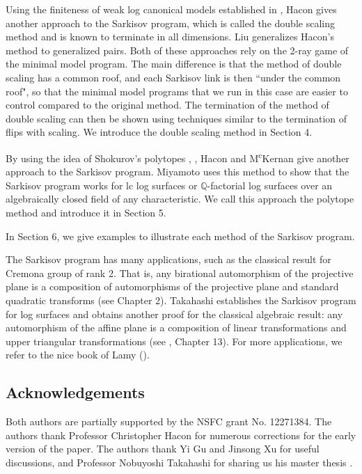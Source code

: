 \documentclass[11pt]{amsart}
\begin{document}
Using the finiteness of weak log canonical models established in \cite{BCHM10}, Hacon \cite{haconMinimalModelProgram2012} gives another approach to the Sarkisov program, which is called the double scaling method and is known to  terminate in all dimensions. 
Liu \cite{liuSarkisovProgramGeneralized2021} generalizes Hacon's method to generalized pairs.
Both of these approaches rely on the 2-ray game of the minimal model program. The main difference is that the method of double 
scaling has a common roof, and each Sarkisov link is then ``under the common roof", so that the minimal model programs that we run in this case are easier to control compared to  the original method.
The termination of the method of double scaling can then be shown using techniques similar to the termination of flips with scaling. We introduce the double scaling method in Section 4. 






By using the idea of Shokurov's polytopes \cite{Sho96}, \cite{cs11}, Hacon and M\textsuperscript{c}Kernan \cite{haconSarkisovProgram2012} give another approach to the Sarkisov program. Miyamoto \cite{miyamoto2019TheSP} uses this method to show that the Sarkisov program works for  lc log surfaces or $\mathbb{Q}$-factorial log surfaces over an algebraically closed  field of any characteristic.  We call this approach the polytope method and introduce it in Section 5.

In Section 6, we give examples to illustrate each method of the Sarkisov program.

The Sarkisov program has many applications, such as the classical result for Cremona group of rank 2. That is, any birational automorphism of the projective plane is a composition of automorphisms of the projective plane and   standard quadratic transforms (see \cite{ksc04} Chapter 2). Takahashi \cite{tak95} establishes the Sarkisov program for  log surfaces and obtains another proof for the classical algebraic result: any automorphism of the affine plane is a composition of linear transformations and upper triangular transformations (see \cite{mat02}, Chapter 13). For more applications, we refer to the nice book of Lamy (\cite{lam22}). 

\subsection*{Acknowledgements} Both authors are partially supported by the NSFC grant No. 12271384.
The authors thank Professor Christopher Hacon for numerous corrections for the early version of the paper. The authors thank Yi Gu and Jinsong Xu for useful discussions, and Professor Nobuyoshi Takahashi for sharing us his master thesis \cite{tak95}.
\end{document}
